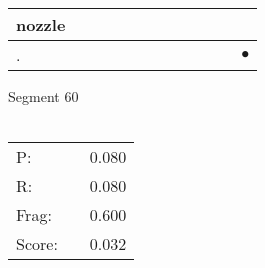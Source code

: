 \documentclass[landscape]{article}
\newcommand{\ssp}{\hspace{2pt}}
\newcommand{\mex}{\cellcolor{g}$\bullet$}
\begin{document}
\begin{tabular}{|l|p{10pt}|p{10pt}|p{10pt}|p{10pt}|p{10pt}|p{10pt}|p{10pt}|p{10pt}|p{10pt}|p{10pt}|p{10pt}|}
\hline
\ssp nozzle \ssp&\hspace{2pt}&\hspace{2pt}&\hspace{2pt}&\hspace{2pt}&\hspace{2pt}&\hspace{2pt}&\hspace{2pt}&\hspace{2pt}&\hspace{2pt}&\hspace{2pt}&\hspace{2pt}\\
\hline
\ssp \cellcolor{ref10}. \ssp&\hspace{2pt}&\hspace{2pt}&\hspace{2pt}&\hspace{2pt}&\hspace{2pt}&\hspace{2pt}&\hspace{2pt}&\hspace{2pt}&\hspace{2pt}&\hspace{2pt}&\hspace{2pt}\mex\\
\hline
\end{tabular}

\vspace{6pt}
\noindent Segment 60\\\\
\noindent\begin{tabular}{lm{12pt}r}
\hline
P:&&0.080\\
R:&&0.080\\
Frag:&&0.600\\
Score:&&0.032\\
\end{tabular}

\newpage
\end{document}
